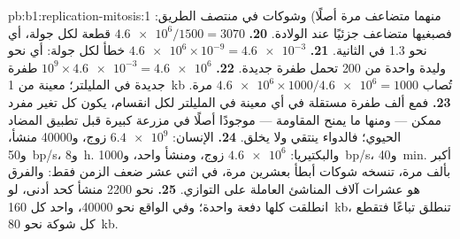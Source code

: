 \begin{solution}{pb:b1:replication-mitosis:1}
منهما متضاعف مرة أصلًا) وشوكات في منتصف الطريق: فصبغيها متضاعف جزئيًا
عند الولادة.
\textbf{20.} $\num{4.6e6}/1500 = 3070$ قطعة لكل جولة، أي نحو 1.3 في
الثانية.
\textbf{21.} $\num{4.6e6}\times 10^{-9} = \num{4.6e-3}$ خطأ لكل
جولة: أي نحو وليدة واحدة من 200 تحمل طفرة جديدة.
\textbf{22.} $10^9\times\num{4.6e-3} = \num{4.6e6}$ طفرة جديدة في
المليلتر؛  معينة من \qty{1}{kb} تُصاب $\num{4.6e6}\times
1000/\num{4.6e6} = 1000$ مرة.
\textbf{23.} فمع ألف طفرة مستقلة في أي  معينة في المليلتر لكل
انقسام، يكون كل تغير مفرد ممكن --- ومنها ما يمنح المقاومة --- موجودًا
أصلًا في مزرعة كبيرة قبل تطبيق المضاد الحيوي؛ فالدواء ينتقي ولا
يخلق.
\textbf{24.} الإنسان: $\num{6.4e9}$ زوج، و\num{40000} منشأ،
و\qty{50}{bp/s}، و\qty{8}{h}. والبكتيريا: $\num{4.6e6}$ زوج، ومنشأ
واحد، و\qty{1000}{bp/s}، و\qty{40}{min}.  أكبر بألف مرة،
تنسخه شوكات أبطأ بعشرين مرة، في اثني عشر ضعف الزمن فقط: والفرق هو
عشرات آلاف المناشئ العاملة على التوازي.
\textbf{25.} نحو \num{2200} منشأ كحد أدنى، لو انطلقت كلها دفعة واحدة؛
وفي الواقع نحو \num{40000}، واحد كل \qty{160}{kb}، تنطلق تباعًا
فتقطع كل شوكة نحو \qty{80}{kb}.
\end{solution}
